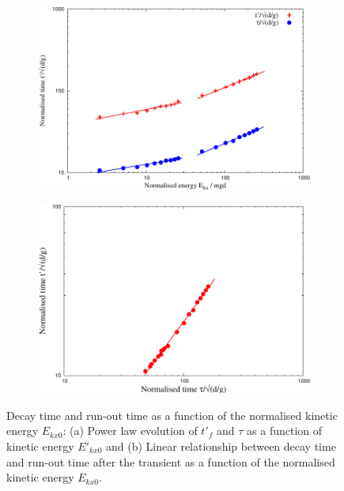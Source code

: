 \documentclass[3p,times,procedia,number]{elsarticle}
\begin{document}
\begin{figure}[tbhp]
  \centering
  \begin{subfigure}[b]{0.4\textwidth}
    \includegraphics[width=\textwidth]{figs/tp_tau_mgd}
    \caption{}
    \label{fig:tp_tau_mgd}
  \end{subfigure}
  \begin{subfigure}[b]{0.4\textwidth}
    \centering
    \includegraphics[width=\textwidth]{figs/tp_tau}
    \caption{}
    \label{fig:tp_tau}
  \end{subfigure}
  \caption{Decay time and run-out time as a function of the normalised kinetic 
  energy $E_{kx0}$: (a) Power law evolution of $t'_f$ and $\tau$ as a function
  of kinetic energy $E'_{kx0}$ and (b) Linear relationship between decay time
  and run-out time after the transient as a function of the normalised kinetic
  energy $E_{kx0}$.}
  \label{fig:tp_Tau}
\end{figure}
\end{document}
